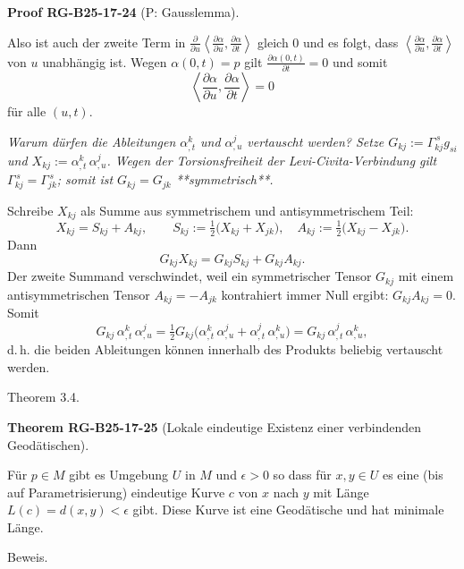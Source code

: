 \documentclass[10pt, letterpaper]{article}
\newenvironment{note}{\par\begingroup\color{hellblau}\itshape}{\par\endgroup}
\newcommand{\CustomHeading}[3]{%
  \par\medskip\noindent%
  \textbf{#1 #2} \textnormal{(#3)}.\enskip%
}
\newenvironment{THEO}[2]{\begin{unitbox}\CustomHeading{Theorem}{#1}{#2}}{\end{unitbox}}
\newenvironment{PROOF}[2]{\begin{unitbox}\CustomHeading{Proof}{#1}{#2}}{\end{unitbox}}
\begin{document}
\begin{PROOF}{RG-B25-17-24}{P: Gausslemma}
Also ist auch der zweite Term in $\frac{\partial}{\partial u}\left\langle\frac{\partial \alpha}{\partial u}, \frac{\partial \alpha}{\partial t}\right\rangle$ gleich 0 und es folgt, dass $\left\langle\frac{\partial \alpha}{\partial u}, \frac{\partial \alpha}{\partial t}\right\rangle$ von $u$ unabhängig ist. Wegen $\alpha(0, t)=p$ gilt $\frac{\partial \alpha(0, t)}{\partial t}=0$ und somit
$$
\left\langle\frac{\partial \alpha}{\partial u}, \frac{\partial \alpha}{\partial t}\right\rangle=0
$$
für alle $(u, t)$.

\begin{note}
Warum dürfen die Ableitungen \(\alpha_{,t}^k\) und
\(\alpha_{,u}^j\) vertauscht werden? Setze
\(G_{kj}:=\Gamma_{kj}^{\,s}g_{si}\)  und
\(X_{kj}:=\alpha_{,t}^k\,\alpha_{,u}^j\).
Wegen der Torsionsfreiheit der Levi-Civita-Verbindung gilt
\(\Gamma_{kj}^{\,s}=\Gamma_{jk}^{\,s}\); somit ist \(G_{kj}=G_{jk}\) **symmetrisch**.

Schreibe \(X_{kj}\) als Summe aus symmetrischem und antisymmetrischem Teil:
\[
X_{kj}=S_{kj}+A_{kj},\qquad
S_{kj}:=\tfrac12\bigl(X_{kj}+X_{jk}\bigr),\quad
A_{kj}:=\tfrac12\bigl(X_{kj}-X_{jk}\bigr).
\]
Dann
\[
G_{kj}X_{kj}=G_{kj}S_{kj}+G_{kj}A_{kj}.
\]
Der zweite Summand verschwindet, weil ein symmetrischer Tensor
\(G_{kj}\) mit einem antisymmetrischen Tensor \(A_{kj}=-A_{jk}\)
kontrahiert immer Null ergibt:
\(
G_{kj}A_{kj}=0.
\)
Somit
\[
G_{kj}\,\alpha_{,t}^k\,\alpha_{,u}^j
   =\tfrac12G_{kj}\bigl(
        \alpha_{,t}^k\,\alpha_{,u}^j
       +\alpha_{,t}^j\,\alpha_{,u}^k\bigr)
   =G_{kj}\,\alpha_{,t}^j\,\alpha_{,u}^k,
\]
d.\,h. die beiden Ableitungen können innerhalb des Produkts beliebig
vertauscht werden.
\end{note}
\end{PROOF}





Theorem 3.4. 


\begin{THEO}{RG-B25-17-25}{Lokale eindeutige Existenz einer verbindenden Geodätischen}
Für $p \in M$ gibt es Umgebung $U$ in $M$ und $\epsilon>0$ so dass für $x, y \in U$ es eine (bis auf Parametrisierung) eindeutige Kurve $c$ von $x$ nach $y$ mit Länge $L(c)=d(x, y)<\epsilon$ gibt. Diese Kurve ist eine Geodätische und hat minimale Länge.
\end{THEO}



Beweis. 
\end{document}
